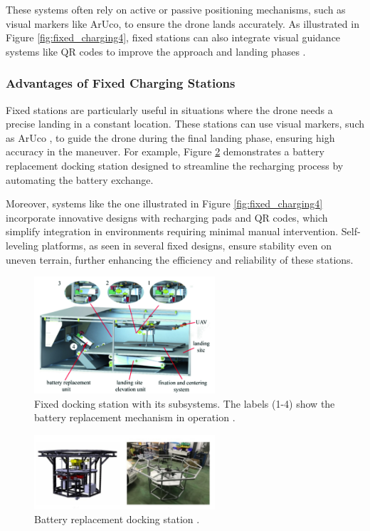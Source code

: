 These systems often rely on active or passive positioning mechanisms, such as visual markers like ArUco, to ensure the drone lands accurately. As illustrated in Figure \ref{fig:fixed_charging4}, fixed stations can also integrate visual guidance systems like QR codes to improve the approach and landing phases \cite{grlj_docking_stations}.



\subsubsection{Advantages of Fixed Charging Stations}

Fixed stations are particularly useful in situations where the drone needs a precise landing in a constant location. These stations can use visual markers, such as ArUco \cite{grlj_docking_stations}, to guide the drone during the final landing phase, ensuring high accuracy in the maneuver. For example, Figure \ref{fig:fixed_charging2} demonstrates a battery replacement docking station designed to streamline the recharging process by automating the battery exchange.

Moreover, systems like the one illustrated in Figure \ref{fig:fixed_charging4} incorporate innovative designs with recharging pads and QR codes, which simplify integration in environments requiring minimal manual intervention. Self-leveling platforms, as seen in several fixed designs, ensure stability even on uneven terrain, further enhancing the efficiency and reliability of these stations.
    \begin{figure}[H]
        \centering
        \includegraphics[width=0.6\textwidth]{pictures/fixed_charging_1.png}
        \caption{Fixed docking station with its subsystems. The labels (1-4) show the battery replacement mechanism in operation \cite{grlj_docking_stations}.}
        \label{fig:fixed_charging1}
    \end{figure}

    \begin{figure}[H]
        \centering
        \includegraphics[width=0.6\textwidth]{pictures/fixed_2.png}
        \caption{Battery replacement docking station \cite{grlj_docking_stations}.}
        \label{fig:fixed_charging2}
    \end{figure}


